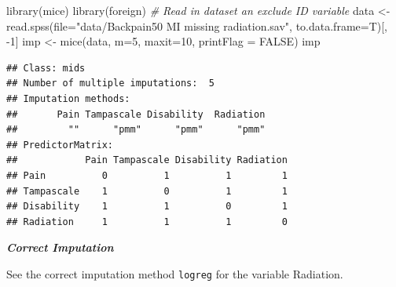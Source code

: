 \documentclass[
]{book}
\newenvironment{Shaded}{\begin{snugshade}}{\end{snugshade}}
\newcommand{\AttributeTok}[1]{\textcolor[rgb]{0.77,0.63,0.00}{#1}}
\newcommand{\CommentTok}[1]{\textcolor[rgb]{0.56,0.35,0.01}{\textit{#1}}}
\newcommand{\ConstantTok}[1]{\textcolor[rgb]{0.00,0.00,0.00}{#1}}
\newcommand{\DecValTok}[1]{\textcolor[rgb]{0.00,0.00,0.81}{#1}}
\newcommand{\FunctionTok}[1]{\textcolor[rgb]{0.00,0.00,0.00}{#1}}
\newcommand{\NormalTok}[1]{#1}
\newcommand{\OtherTok}[1]{\textcolor[rgb]{0.56,0.35,0.01}{#1}}
\newcommand{\SpecialCharTok}[1]{\textcolor[rgb]{0.00,0.00,0.00}{#1}}
\newcommand{\StringTok}[1]{\textcolor[rgb]{0.31,0.60,0.02}{#1}}
\begin{document}
\begin{Shaded}
\begin{Highlighting}[]
\FunctionTok{library}\NormalTok{(mice)}
\FunctionTok{library}\NormalTok{(foreign)}
\CommentTok{\# Read in dataset an exclude ID variable}
\NormalTok{data }\OtherTok{\textless{}{-}} \FunctionTok{read.spss}\NormalTok{(}\AttributeTok{file=}\StringTok{"data/Backpain50 MI missing radiation.sav"}\NormalTok{, }\AttributeTok{to.data.frame=}\NormalTok{T)[, }\SpecialCharTok{{-}}\DecValTok{1}\NormalTok{] }
\NormalTok{imp }\OtherTok{\textless{}{-}} \FunctionTok{mice}\NormalTok{(data, }\AttributeTok{m=}\DecValTok{5}\NormalTok{, }\AttributeTok{maxit=}\DecValTok{10}\NormalTok{, }\AttributeTok{printFlag =} \ConstantTok{FALSE}\NormalTok{)}
\NormalTok{imp}
\end{Highlighting}
\end{Shaded}

\begin{verbatim}
## Class: mids
## Number of multiple imputations:  5 
## Imputation methods:
##       Pain Tampascale Disability  Radiation 
##         ""      "pmm"      "pmm"      "pmm" 
## PredictorMatrix:
##            Pain Tampascale Disability Radiation
## Pain          0          1          1         1
## Tampascale    1          0          1         1
## Disability    1          1          0         1
## Radiation     1          1          1         0
\end{verbatim}

\textbf{\emph{Correct Imputation}}

See the correct imputation method \texttt{logreg} for the variable Radiation.

\begin{Shaded}
\end{Shaded}
\end{document}
